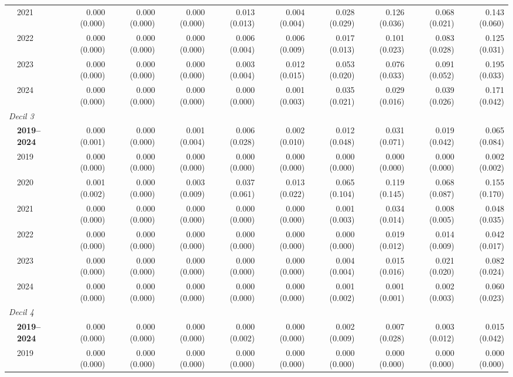 \begin{table}[htbp]
\begin{tabular}{llrrrrrrrrr}
 & 2021 & 0.000 (0.000) & 0.000 (0.000) & 0.000 (0.000) & 0.013 (0.013) & 0.004 (0.004) & 0.028 (0.029) & 0.126 (0.036) & 0.068 (0.021) & 0.143 (0.060) \\
 & 2022 & 0.000 (0.000) & 0.000 (0.000) & 0.000 (0.000) & 0.006 (0.004) & 0.006 (0.009) & 0.017 (0.013) & 0.101 (0.023) & 0.083 (0.028) & 0.125 (0.031) \\
 & 2023 & 0.000 (0.000) & 0.000 (0.000) & 0.000 (0.000) & 0.003 (0.004) & 0.012 (0.015) & 0.053 (0.020) & 0.076 (0.033) & 0.091 (0.052) & 0.195 (0.033) \\
 & 2024 & 0.000 (0.000) & 0.000 (0.000) & 0.000 (0.000) & 0.000 (0.000) & 0.001 (0.003) & 0.035 (0.021) & 0.029 (0.016) & 0.039 (0.026) & 0.171 (0.042) \\
\midrule
\multicolumn{11}{l}{\textit{Decil 3}} \\
 & \textbf{2019–2024} & 0.000 (0.001) & 0.000 (0.000) & 0.001 (0.004) & 0.006 (0.028) & 0.002 (0.010) & 0.012 (0.048) & 0.031 (0.071) & 0.019 (0.042) & 0.065 (0.084) \\
 & 2019 & 0.000 (0.000) & 0.000 (0.000) & 0.000 (0.000) & 0.000 (0.000) & 0.000 (0.000) & 0.000 (0.000) & 0.000 (0.000) & 0.000 (0.000) & 0.002 (0.002) \\
 & 2020 & 0.001 (0.002) & 0.000 (0.000) & 0.003 (0.009) & 0.037 (0.061) & 0.013 (0.022) & 0.065 (0.104) & 0.119 (0.145) & 0.068 (0.087) & 0.155 (0.170) \\
 & 2021 & 0.000 (0.000) & 0.000 (0.000) & 0.000 (0.000) & 0.000 (0.000) & 0.000 (0.000) & 0.001 (0.003) & 0.034 (0.014) & 0.008 (0.005) & 0.048 (0.035) \\
 & 2022 & 0.000 (0.000) & 0.000 (0.000) & 0.000 (0.000) & 0.000 (0.000) & 0.000 (0.000) & 0.000 (0.000) & 0.019 (0.012) & 0.014 (0.009) & 0.042 (0.017) \\
 & 2023 & 0.000 (0.000) & 0.000 (0.000) & 0.000 (0.000) & 0.000 (0.000) & 0.000 (0.000) & 0.004 (0.004) & 0.015 (0.016) & 0.021 (0.020) & 0.082 (0.024) \\
 & 2024 & 0.000 (0.000) & 0.000 (0.000) & 0.000 (0.000) & 0.000 (0.000) & 0.000 (0.000) & 0.001 (0.002) & 0.001 (0.001) & 0.002 (0.003) & 0.060 (0.023) \\
\midrule
\multicolumn{11}{l}{\textit{Decil 4}} \\
 & \textbf{2019–2024} & 0.000 (0.000) & 0.000 (0.000) & 0.000 (0.000) & 0.000 (0.002) & 0.000 (0.000) & 0.002 (0.009) & 0.007 (0.028) & 0.003 (0.012) & 0.015 (0.042) \\
 & 2019 & 0.000 (0.000) & 0.000 (0.000) & 0.000 (0.000) & 0.000 (0.000) & 0.000 (0.000) & 0.000 (0.000) & 0.000 (0.000) & 0.000 (0.000) & 0.000 (0.000) \\

\end{tabular}
\end{table}
